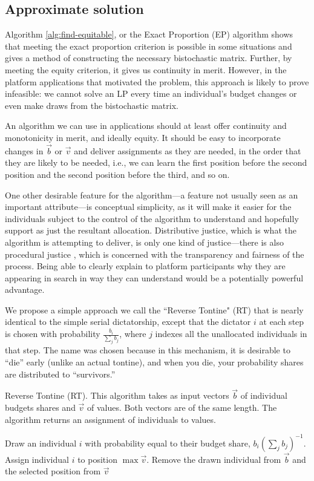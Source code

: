 \subsection{Approximate solution}
Algorithm \ref{alg:find-equitable}, or the Exact Proportion (EP)
algorithm shows that meeting the exact proportion criterion is
possible in some situations and gives a method of constructing the
necessary bistochastic matrix. Further, by meeting the equity
criterion, it gives us continuity in merit. However, in the platform
applications that motivated the problem, this approach is likely to
prove infeasible: we cannot solve an LP every time an individual's
budget changes or even make draws from the bistochastic matrix.

An algorithm we can use in applications should at least offer
continuity and monotonicity in merit, and ideally equity. It should be
easy to incorporate changes in $\vec{b}$ or $\vec{v}$ and deliver
assignments as they are needed, in the order that they are likely to
be needed, i.e., we can learn the first position before the second
position and the second position before the third, and so on.

One other desirable feature for the algorithm---a feature not usually
seen as an important attribute---is conceptual simplicity, as it will
make it easier for the individuals subject to the control of the
algorithm to understand and hopefully support as just the resultant
allocation. Distributive justice, which is what the algorithm is
attempting to deliver, is only one kind of justice---there is also
procedural justice \cite{rawls1999theory}, which is concerned with the
transparency and fairness of the process. Being able to clearly
explain to platform participants why they are appearing in search in
way they can understand would be a potentially powerful advantage.

\label{sec:tontine}
We propose a simple approach we call the ``Reverse Tontine" (RT) that
is nearly identical to the simple serial dictatorship, except that the
dictator $i$ at each step is chosen with probability
$\frac{b_i}{\sum_j b_j}$, where $j$ indexes all the unallocated
individuals in that step. The name was chosen because in this
mechanism, it is desirable to ``die'' early (unlike an actual
tontine), and when you die, your probability shares are distributed to
``survivors.''

\begin{algorithm} 
\caption{Reverse Tontine (RT). This algorithm takes as input vectors
  $\vec{b}$ of individual budgets shares and $\vec{v}$ of values. Both
  vectors are of the same length. The algorithm returns an assignment
  of individuals to values.}
\label{alg:tontine}

\begin{algorithmic}
\STATE Draw an individual $i$ with probability equal to their budget share,
$b_i \left(\sum_j b_j\right)^{-1}$. 
\STATE Assign individual $i$ to position $\max \vec
v$. 
\STATE Remove the drawn individual from $\vec b$ and the selected position
from $\vec v$ 
\ENDWHILE
\end{algorithmic}
\end{algorithm} 


